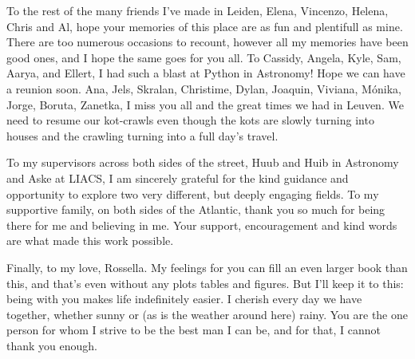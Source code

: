 \begin{thesisacknowledgements}
\begin{changemargin}{-1cm}{-1cm}
{    To the rest of the many friends I've made in Leiden, Elena, Vincenzo, Helena, Chris and Al, hope your memories of this place are as fun and plentifull as mine. There are too numerous occasions to recount, however all my memories have been good ones, and I hope the same goes for you all. To Cassidy, Angela, Kyle, Sam, Aarya, and Ellert, I had such a blast at Python in Astronomy! Hope we can have a reunion soon. Ana, Jels, Skralan, Christime, Dylan, Joaquin, Viviana, M{\'o}nika, Jorge, Boruta, Zanetka, I miss you all and the great times we had in Leuven. We need to resume our kot-crawls even though the kots are slowly turning into houses and the crawling turning into a full day's travel. 

    To my supervisors across both sides of the street, Huub and Huib in Astronomy and Aske at LIACS, I am sincerely grateful for the kind guidance and opportunity to explore two very different, but deeply engaging fields. To my supportive family, on both sides of the Atlantic, thank you so much for being there for me and believing in me. Your support, encouragement and kind words are what made this work possible. 

    Finally, to my love, Rossella. My feelings for you can fill an even larger book than this, and that's even without any plots tables and figures. But I'll keep it to this: being with you makes life indefinitely easier. I cherish every day we have together, whether sunny or (as is the weather around here) rainy. You are the one person for whom I strive to be the best man I can be, and for that, I cannot thank you enough.  }
\end{changemargin}

\end{thesisacknowledgements}

